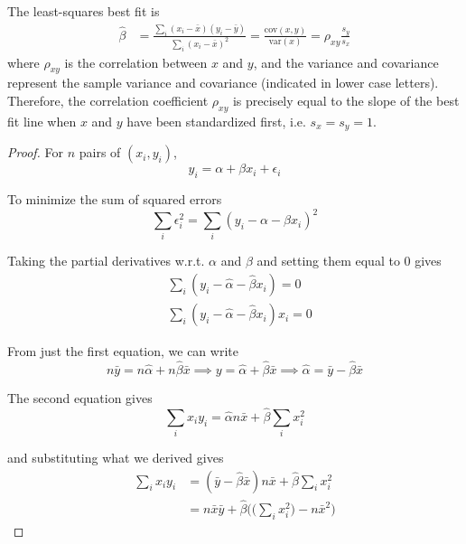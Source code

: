   \begin{theorem}
    The least-squares best fit is 
    \begin{align}
      \hat{\beta} & = \frac{\sum_i (x_i - \bar{x}) (y_i - \bar{y})}{\sum_i (x_i - \bar{x})^2} = \frac{\mathrm{cov}(x, y)}{\mathrm{var}(x)} = \rho_{xy} \frac{s_y}{s_x}
    \end{align}
    where $\rho_{xy}$ is the correlation between $x$ and $y$, and the variance and covariance represent the sample variance and covariance (indicated in lower case letters). Therefore, the correlation coefficient $\rho_{xy}$ is precisely equal to the slope of the best fit line when $x$ and $y$ have been standardized first, i.e. $s_x = s_y = 1$. 
  \end{theorem}
  \begin{proof}
    For $n$ pairs of $(x_i, y_i)$, 
    \begin{equation}
      y_i = \alpha + \beta x_i + \epsilon_i
    \end{equation}

    To minimize the sum of squared errors 
    \begin{equation}
      \sum_{i} \epsilon_i^2 = \sum_{i} (y_i - \alpha - \beta x_i)^2
    \end{equation}

    Taking the partial derivatives w.r.t. $\alpha$ and $\beta$ and setting them equal to $0$ gives 
    \begin{align}
      &\sum_i (y_i - \hat{\alpha} - \hat{\beta} x_i) = 0 \\
      &\sum_i (y_i - \hat{\alpha} - \hat{\beta} x_i) x_i = 0
    \end{align}

    From just the first equation, we can write 
    \begin{equation}
      n \bar{y} = n \hat{\alpha} + n \hat{\beta} \bar{x} \implies y = \hat{\alpha} + \hat{\beta} \bar{x} \implies \hat{\alpha}  = \bar{y} - \hat{\beta} \bar{x} 
    \end{equation}

    The second equation gives 
    \begin{equation}
      \sum_{i} x_i y_i = \hat{\alpha} n \bar{x} + \hat{\beta} \sum_{i} x_i^2
    \end{equation}

    and substituting what we derived gives 
    \begin{align}
      \sum_{i} x_i y_i & = (\bar{y} - \hat{\beta} \bar{x}) n \bar{x} + \hat{\beta} \sum_i x_i^2 \\
      & = n \bar{x} \bar{y} + \hat{\beta} \bigg( \Big(\sum_i x_i^2 \Big) - n \bar{x}^2 \bigg)
    \end{align}


\end{proof}
